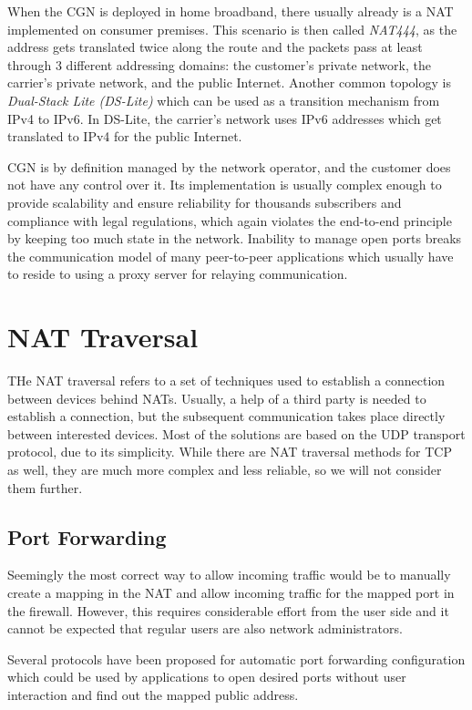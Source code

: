 When the CGN is deployed in home broadband, there usually already is a NAT implemented on consumer premises. This scenario is then called \textit{NAT444}, as the address gets translated twice along the route and the packets pass at least through 3 different addressing domains: the customer's private network, the carrier's private network, and the public Internet. Another common topology is \textit{Dual-Stack Lite (DS-Lite)} which can be used as a transition mechanism from IPv4 to IPv6. In DS-Lite, the carrier's network uses IPv6 addresses which get translated to IPv4 for the public Internet.

CGN is by definition managed by the network operator, and the customer does not have any control over it. Its implementation is usually complex enough to provide scalability and ensure reliability for thousands subscribers and compliance with legal regulations, which again violates the end-to-end principle by keeping too much state in the network. Inability to manage open ports breaks the communication model of many peer-to-peer applications which usually have to reside to using a proxy server for relaying communication.

\section{NAT Traversal}

THe NAT traversal refers to a set of techniques used to establish a connection between devices behind NATs. Usually, a help of a third party is needed to establish a connection, but the subsequent communication takes place directly between interested devices.
Most of the solutions are based on the UDP transport protocol, due to its simplicity. While there are NAT traversal methods for TCP as well, they are much more complex and less reliable, so we will not consider them further.

\subsection{Port Forwarding}

Seemingly the most correct way to allow incoming traffic would be to manually create a mapping in the NAT and allow incoming traffic for the mapped port in the firewall. However, this requires considerable effort from the user side and it cannot be expected that regular users are also network administrators.

Several protocols have been proposed for automatic port forwarding configuration which could be used by applications to open desired ports without user interaction and find out the mapped public address.

